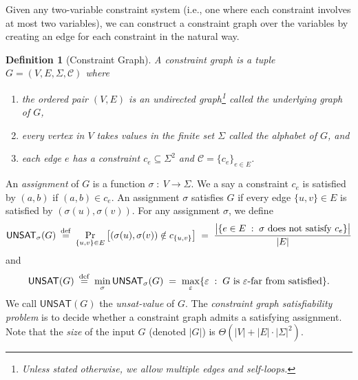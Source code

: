 \documentclass{article}
\newtheorem{definition}[theorem]{Definition}
\newcommand{\class}[1]{\mathbf{#1}}
\newcommand{\NP}{\class{NP}}
\newcommand{\UNSAT}{\mathsf{UNSAT}}
\newcommand{\eqdef}{\mathbin{\stackrel{\rm def}{=}}}
\begin{document}
Given any two-variable constraint system (i.e., one where each
constraint involves at most two variables), we can construct a constraint graph
over the variables by creating an edge for each constraint in the natural way.



\begin{definition}[Constraint Graph] A constraint graph is a tuple
$G = (V, E, \Sigma, \mathcal{C})$ where
\begin{enumerate}
\item the ordered pair $(V, E)$ is an undirected graph\footnote{Unless stated otherwise, we allow multiple edges and self-loops.} called the underlying
  graph of $G$,
\item every vertex in $V$ takes values in the finite set $\Sigma$
  called the alphabet of $G$, and
\item each edge $e$  has a constraint $c_e \subseteq \Sigma^2$ and
  $\mathcal{C} = \{c_e\}_{e \in E}$.
\end{enumerate}
\end{definition}

An \emph{assignment} of $G$ is a function $\sigma \;:\: V \to \Sigma$.
We a say a constraint $c_e$ is satisfied by $(a, b)$ if $(a, b) \in c_e$. 
An assignment $\sigma$ satisfies $G$ if every edge $\{u, v\} \in E$
is satisfied by $(\sigma(u), \sigma(v))$.
For any assignment $\sigma$, we define
\begin{align*}
\UNSAT_\sigma(G) \;\eqdef\; \Pr_{\{u, v\} \in E} \big[(\sigma(u), \sigma(v)) \notin c_{\{u, v\}}\big] 
  \;=\; \frac{\big|\{e \in E \;:\; \sigma \text{ does not satisfy } c_e\}\big|}{|E|}
\end{align*}
and
\begin{align*}
\UNSAT(G) \;\eqdef\; \min_\sigma \UNSAT_\sigma(G)
  \;=\; \max_\varepsilon \{\varepsilon \;:\; G \text{ is } \varepsilon\text{-far from satisfied} \}.
\end{align*}
We call $\UNSAT(G)$ the \emph{unsat-value} of $G$.
The \emph{constraint graph satisfiability problem} is to decide whether
a constraint graph admits a satisfying assignment.
Note that the \emph{size} of the input $G$ (denoted $|G|$) is $\Theta(|V|+|E|\cdot|\Sigma|^2)$.
\end{document}
